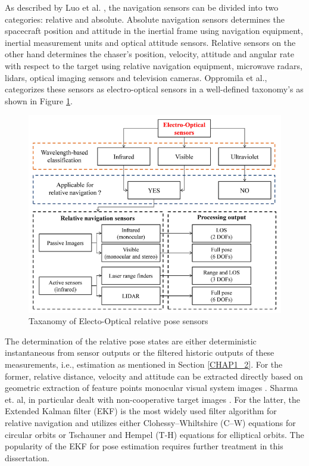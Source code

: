 As described by Luo et al. \cite{luoSurvey13}, the navigation sensors can be divided into two categories: relative and absolute. Absolute navigation sensors determines the spacecraft position and attitude in the inertial frame using navigation equipment, inertial measurement units and optical attitude sensors. Relative sensors on the other hand determines the chaser's position, velocity, attitude and angular rate with respect to the target using relative navigation equipment, microwave radars, lidars, optical imaging sensors and television cameras. Oppromila et al.\cite{OpromollaPose17}, categorizes these sensors as electro-optical sensors in a well-defined taxonomy's as shown in Figure \ref{fig:taxonomyEo}. 
\begin{figure}[ht]
    \centering
    \includegraphics[width=1\textwidth]{Figures/OppromolaTaxanomyPoseSensors.PNG}
    \caption{Taxanomy of Electo-Optical relative pose sensors \cite{OpromollaPose17}}
    \label{fig:taxonomyEo}
\end{figure}
The determination of the relative pose states are either deterministic instantaneous from sensor outputs or the filtered historic outputs of these measurements, i.e., estimation as mentioned in Section \ref{CHAP1_2}. For the former, relative distance, velocity and attitude can be extracted directly based on geometric extraction of feature points monocular visual system images \cite{aghiliPoseVision10, leiPoseSlam19, sharmePoseNonC17a, ShijieMono10}. Sharma et. al, in particular  dealt with non-cooperative target images \cite{sharmePoseNonC17a}. For the latter, the Extended Kalman filter (EKF) is the most widely used filter algorithm for relative navigation \cite{dAmicoPrisma11,karlgaardAdaptiveEkf11} and utilizes either Clohessy–Whiltshire (C–W) equations \cite{CW} for circular orbits or Tschauner and Hempel (T-H) equations \cite{Tschauner65} for elliptical orbits. The popularity of the EKF for pose estimation requires further treatment in this dissertation. 

